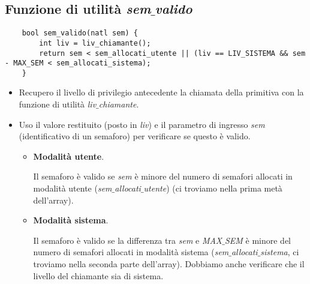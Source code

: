 \subsection{Funzione di utilità \emph{sem$\_$valido}} 
\small
\begin{verbatim}
	bool sem_valido(natl sem) {
		int liv = liv_chiamante();
		return sem < sem_allocati_utente || (liv == LIV_SISTEMA && sem - MAX_SEM < sem_allocati_sistema);
	}
\end{verbatim}
\normalsize
\begin{itemize}
	\item Recupero il livello  di privilegio antecedente la chiamata della primitiva con la funzione di utilità \emph{liv$\_$chiamante}.
	\item Uso il valore restituito (posto in \emph{liv}) e il parametro di ingresso \emph{sem} (identificativo di un semaforo) per verificare se questo è valido.
	\begin{itemize}
		\item \textbf{Modalità utente}.
		
		Il semaforo è valido se \emph{sem} è minore del numero di semafori allocati in modalità utente (\emph{sem$\_$allocati$\_$utente}) (ci troviamo nella prima metà dell'array).
		\item \textbf{Modalità sistema}. 
		
		Il semaforo è valido se la differenza tra \emph{sem} e \emph{MAX$\_$SEM} è minore del numero di semafori allocati in modalità sistema (\emph{sem$\_$allocati$\_$sistema}, ci troviamo nella seconda parte dell'array). Dobbiamo anche verificare che il livello del chiamante sia di sistema.  
	\end{itemize}
\end{itemize}

